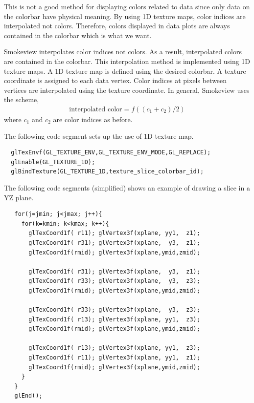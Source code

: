 \documentclass[11pt,twoside]{book}
\begin{document}
This is not a good method for displaying colors related to data
since only data on the colorbar have physical meaning.  By using
1D texture maps, color indices are interpolated not colors.
Therefore, colors displayed in data plots are always contained in
the colorbar which is what we want.

Smokeview interpolates color indices not colors. As a
result, interpolated colors are contained in the colorbar.  This
interpolation method is implemented using 1D texture maps.  A 1D
texture map is defined using the desired colorbar.  A texture
coordinate is assigned to each data vertex.    Color indices at
pixels between vertices are interpolated using the texture
coordinate.  In general, Smokeview uses the scheme,
\begin{eqnarray}
\mbox{interpolated color}=f((c_1+c_2)/2)
\end{eqnarray}
where $c_1$ and $c_2$ are color indices as before.

The following code segment sets up the use of 1D texture map.

\begin{lstlisting}
  glTexEnvf(GL_TEXTURE_ENV,GL_TEXTURE_ENV_MODE,GL_REPLACE);
  glEnable(GL_TEXTURE_1D);
  glBindTexture(GL_TEXTURE_1D,texture_slice_colorbar_id);
\end{lstlisting}

The following code segments (simplified) shows an example of drawing a slice in a YZ plane.

\begin{lstlisting}
   for(j=jmin; j<jmax; j++){
     for(k=kmin; k<kmax; k++){
       glTexCoord1f( r11); glVertex3f(xplane, yy1,  z1);
       glTexCoord1f( r31); glVertex3f(xplane,  y3,  z1);
       glTexCoord1f(rmid); glVertex3f(xplane,ymid,zmid);

       glTexCoord1f( r31); glVertex3f(xplane,  y3,  z1);
       glTexCoord1f( r33); glVertex3f(xplane,  y3,  z3);
       glTexCoord1f(rmid); glVertex3f(xplane,ymid,zmid);

       glTexCoord1f( r33); glVertex3f(xplane,  y3,  z3);
       glTexCoord1f( r13); glVertex3f(xplane, yy1,  z3);
       glTexCoord1f(rmid); glVertex3f(xplane,ymid,zmid);

       glTexCoord1f( r13); glVertex3f(xplane, yy1,  z3);
       glTexCoord1f( r11); glVertex3f(xplane, yy1,  z1);
       glTexCoord1f(rmid); glVertex3f(xplane,ymid,zmid);
     }
   }
   glEnd();
\end{lstlisting}
\end{document}
